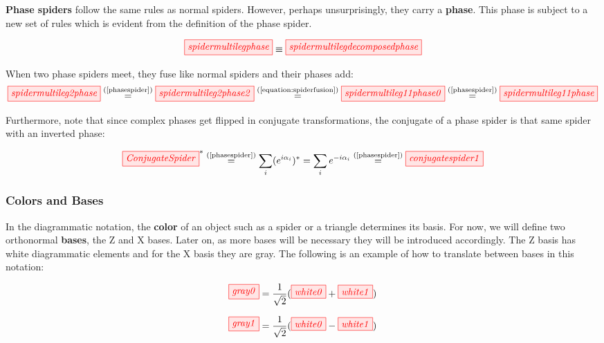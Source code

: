 \documentclass[]{article}
\newcommand{\equaltext}[1]{\ensuremath{\stackrel{\text{#1}}{=}}}
\begin{document}
\textbf{Phase spiders} follow the same rules as normal spiders. However, perhaps unsurprisingly, they carry a \textbf{phase}. This phase is subject to a new set of rules which is evident from the definition of the phase spider. 

\begin{equation}
\label{phasespider}
\tikzfig{spidermultilegphase} \equiv \tikzfig{spidermultilegdecomposedphase}
\end{equation}

When two phase spiders meet, they fuse like normal spiders and their phases add:
\begin{equation}
\label{equation:phasespiderfusion}
	\tikzfig{spidermultileg2phase} \equaltext{(\ref{phasespider})} \tikzfig{spidermultileg2phase2} \equaltext{(\ref{equation:spiderfusion})}\tikzfig{spidermultileg11phase0} \equaltext{(\ref{phasespider})}\tikzfig{spidermultileg11phase}
\end{equation}


Furthermore, note that since complex phases get flipped in conjugate transformations, the conjugate of a phase spider is that same spider with an inverted phase:

\begin{equation}
\label{equation:conjugatespider}
\tikzfig{ConjugateSpider}^* \equaltext{(\ref{phasespider})} \sum\limits_{i}(e^{i\alpha_i})^*= \sum\limits_{i}e^{-i\alpha_i} \equaltext{(\ref{phasespider})} \tikzfig{conjugatespider1}
\end{equation}

\subsubsection{Colors and Bases}
\label{coloursandbases}

In the diagrammatic notation, the \textbf{color} of an object such as a spider or a triangle determines its basis. For now, we will define two orthonormal \textbf{bases}, the Z and X bases. Later on, as more bases will be necessary they will be introduced accordingly. The Z basis has white diagrammatic elements and for the X basis they are gray. The following is an example of how to translate between bases in this notation:

\begin{equation}
\label{equation:gray0}
\tikzfig{gray0} =\frac{1}{\sqrt{2}}( \tikzfig{white0} + \tikzfig{white1})
\end{equation}

\begin{equation}
\label{equation:gray1}
\tikzfig{gray1} =\frac{1}{\sqrt{2}}( \tikzfig{white0} - \tikzfig{white1})
\end{equation}
\end{document}
